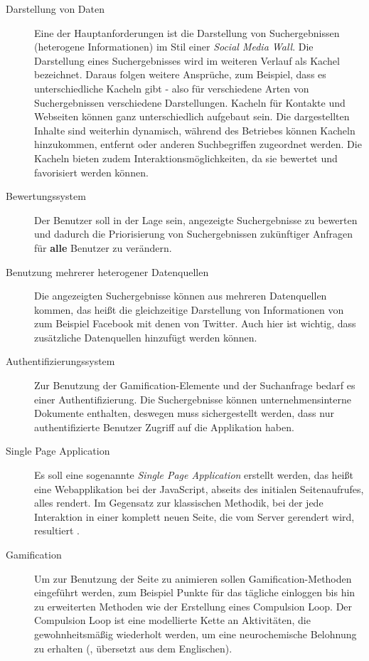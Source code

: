 \documentclass[12pt,twoside]{book}
\begin{document}
\begin{description}

\item[Darstellung von Daten]

Eine der Hauptanforderungen ist die Darstellung von Suchergebnissen (heterogene Informationen) im Stil einer \textit{Social Media Wall}. Die Darstellung eines Suchergebnisses wird im weiteren Verlauf als Kachel bezeichnet. Daraus folgen weitere Ansprüche, zum Beispiel, dass es unterschiedliche Kacheln gibt - also für verschiedene Arten von Suchergebnissen verschiedene Darstellungen. Kacheln für Kontakte und Webseiten können ganz unterschiedlich aufgebaut sein. Die dargestellten Inhalte sind weiterhin dynamisch, während des Betriebes können Kacheln hinzukommen, entfernt oder anderen Suchbegriffen zugeordnet werden. Die Kacheln bieten zudem Interaktionsmöglichkeiten, da sie bewertet und favorisiert werden können.

\item[Bewertungssystem]

  Der Benutzer soll in der Lage sein, angezeigte Suchergebnisse zu bewerten und dadurch die Priorisierung von Suchergebnissen zukünftiger Anfragen für \textbf{alle} Benutzer zu verändern.

\item[Benutzung mehrerer heterogener Datenquellen]
  Die angezeigten Suchergebnisse können aus mehreren Datenquellen kommen, das heißt die gleichzeitige Darstellung von Informationen von zum Beispiel Facebook mit denen von Twitter. Auch hier ist wichtig, dass zusätzliche Datenquellen hinzufügt werden können.

\item[Authentifizierungssystem]
	Zur Benutzung der Gamification-Elemente und der Suchanfrage bedarf es einer Authentifizierung. Die Suchergebnisse können unternehmensinterne Dokumente enthalten, deswegen muss sichergestellt werden, dass nur authentifizierte Benutzer Zugriff auf die Applikation haben.

\item[Single Page Application]
  Es soll eine sogenannte \textit{Single Page Application} erstellt werden, das heißt eine Webapplikation bei der JavaScript, abseits des initialen Seitenaufrufes, alles rendert. Im Gegensatz zur klassischen Methodik, bei der jede Interaktion in einer komplett neuen Seite, die vom Server gerendert wird, resultiert \cite{mesbah2007migrating}.

\item[Gamification]
  Um zur Benutzung der Seite zu animieren sollen Gamification-Methoden eingeführt werden, zum Beispiel Punkte für das tägliche einloggen bis hin zu erweiterten Methoden wie der Erstellung eines Compulsion Loop. \glqq Der Compulsion Loop ist eine modellierte Kette an Aktivitäten, die gewohnheitsmäßig wiederholt werden, um eine neurochemische Belohnung zu erhalten\grqq{} (\cite{gamasutra}, übersetzt aus dem Englischen).


\end{description}
\end{document}
